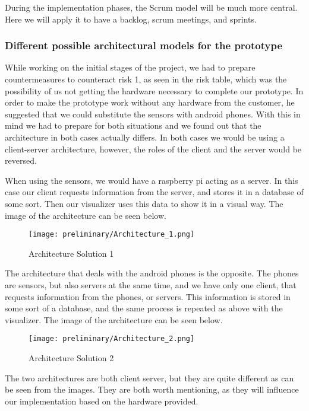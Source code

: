 \documentclass[../document]{subfiles}
\begin{document}
During the implementation phases, the Scrum model will be much more central. Here we will apply it to have a backlog, scrum meetings, and sprints.

\subsubsection{Different possible architectural models for the prototype}
While working on the initial stages of the project, we had to prepare countermeasures to counteract risk 1, as seen in the risk table, which was the possibility of us not getting the hardware necessary to complete our prototype. In order to make the prototype work without any hardware from the customer, he suggested that we could substitute the sensors with android phones. With this in mind we had to prepare for both situations and we found out that the architecture in both cases actually differs. In both cases we would be using a client-server architecture, however, the roles of the client and the server would be reversed.

When using the sensors, we would have a raspberry pi acting as a server. In this case our client requests information from the server, and stores it in a database of some sort. Then our visualizer uses this data to show it in a visual way. The image of the architecture can be seen below.

\begin{figure}[H]
	\texttt{[image: preliminary/Architecture\_1.png]}
	\caption{Architecture Solution 1}
\end{figure}

The architecture that deals with the android phones is the opposite. The phones are sensors, but also servers at the same time, and we have only one client, that requests information from the phones, or servers. This information is stored in some sort of a database, and the same process is repeated as above with the visualizer. The image of the architecture can be seen below.

\begin{figure}[H]
	\texttt{[image: preliminary/Architecture\_2.png]}
	\caption{Architecture Solution 2}
\end{figure}

The two architectures are both client server, but they are quite different as can be seen from the images. They are both worth mentioning, as they will influence our implementation based on the hardware provided.
\end{document}
